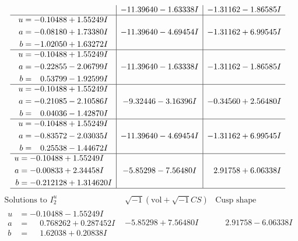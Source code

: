 \documentclass[1p]{elsarticle_modified}
\theoremstyle{definition}
\newcommand{\I}{\sqrt{-1}}
\begin{document}
$$\begin{array}{c|c|c}
 & -11.39640 - 1.63338 I & -1.31162 - 1.86585 I \\ \hline\begin{aligned}
u &= -0.10488 + 1.55249 I \\
a &= -0.08180 + 1.73380 I \\
b &= -1.02050 + 1.63272 I\end{aligned}
 & -11.39640 - 4.69454 I & -1.31162 + 6.99545 I \\ \hline\begin{aligned}
u &= -0.10488 + 1.55249 I \\
a &= -0.22855 - 2.06799 I \\
b &= \phantom{-}0.53799 - 1.92599 I\end{aligned}
 & -11.39640 - 1.63338 I & -1.31162 - 1.86585 I \\ \hline\begin{aligned}
u &= -0.10488 + 1.55249 I \\
a &= -0.21085 - 2.10586 I \\
b &= \phantom{-}0.04036 - 1.42870 I\end{aligned}
 & -9.32446 - 3.16396 I & -0.34560 + 2.56480 I \\ \hline\begin{aligned}
u &= -0.10488 + 1.55249 I \\
a &= -0.83572 - 2.03035 I \\
b &= \phantom{-}0.25538 - 1.44672 I\end{aligned}
 & -11.39640 - 4.69454 I & -1.31162 + 6.99545 I \\ \hline\begin{aligned}
u &= -0.10488 + 1.55249 I \\
a &= -0.00833 + 2.34458 I \\
b &= -0.212128 + 1.314620 I\end{aligned}
 & -5.85298 - 7.56480 I & \phantom{-}2.91758 + 6.06338 I\\
 \hline 
 \end{array}$$\newpage$$\begin{array}{c|c|c}  
\text{Solutions to }I^u_{2}& \I (\text{vol} + \sqrt{-1}CS) & \text{Cusp shape}\\
 \hline 
\begin{aligned}
u &= -0.10488 - 1.55249 I \\
a &= \phantom{-}0.768262 + 0.287452 I \\
b &= \phantom{-}1.62038 + 0.20838 I\end{aligned}
 & -5.85298 + 7.56480 I & \phantom{-}2.91758 - 6.06338 I \\ \hline\begin{aligned}

\end{aligned}
\end{array}$$
\end{document}
